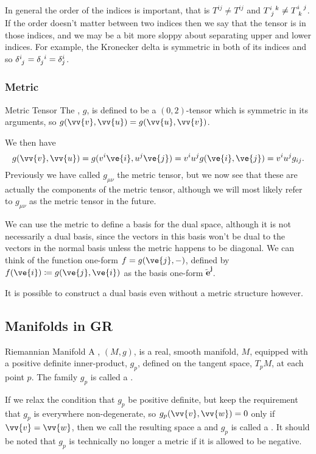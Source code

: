 \documentclass[fleqn]{NotesClass}
\newcommand*{\cve}[1]{\bm{\tilde{e}^{#1}}}
\begin{document}
    In general the order of the indices is important, that is \(T^{ij} \ne T^{ij}\) and \(\tensor{T}{^i_j^k} \ne \tensor{T}{^i_k^j}\).
    If the order doesn't matter between two indices then we say that the tensor is  in those indices, and we may be a bit more sloppy about separating upper and lower indices.
    For example, the Kronecker delta is symmetric in both of its indices and so \(\tensor{\delta}{^i_j} = \tensor{\delta}{_j^i} = \delta^i_j\).
    
    \subsubsection{Metric}
    \begin{dfn}{Metric Tensor}{}
        The , \(g\), is defined to be a \((0, 2)\)-tensor which is symmetric in its arguments, so \(g(\vv{v}, \vv{u}) = g(\vv{u}, \vv{v})\).
    \end{dfn}
    We then have
    \begin{equation}
        g(\vv{v}, \vv{u}) = g(v^i\ve{i}, u^j\ve{j}) = v^iu^jg(\ve{i}, \ve{j}) = v^iu^jg_{ij}.
    \end{equation}
    Previously we have called \(g_{\mu\nu}\) the metric tensor, but we now see that these are actually the components of the metric tensor, although we will most likely refer to \(g_{\mu\nu}\) as the metric tensor in the future.
    
    We can use the metric to define a basis for the dual space, although it is not necessarily a dual basis, since the vectors in this basis won't be dual to the vectors in the normal basis unless the metric happens to be diagonal.
    We can think of the function one-form \(f = g(\ve{j}, -)\), defined by\(f(\ve{i}) \coloneqq g(\ve{j}, \ve{i})\) as the basis one-form \(\cve{j}\).
    
    It is possible to construct a dual basis even without a metric structure however.
    
    \subsection{Manifolds in GR}
    \begin{dfn}{Riemannian Manifold}{}
        A , \((M, g)\), is a real, smooth manifold, \(M\), equipped with a positive definite inner-product, \(g_p\), defined on the tangent space, \(T_pM\), at each point \(p\).
        The family \(g_p\) is called a .
        
        If we relax the condition that \(g_p\) be positive definite, but keep the requirement that \(g_p\) is everywhere non-degenerate, so \(g_p(\vv{v}, \vv{w}) = 0\) only if \(\vv{v} = \vv{w}\), then we call the resulting space a  and \(g_p\) is called a .
        It should be noted that \(g_p\) is technically no longer a metric if it is allowed to be negative.
    \end{dfn}
\end{document}
